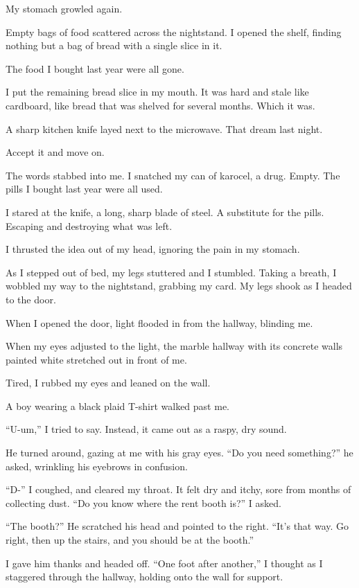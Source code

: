My stomach growled again.

Empty bags of food scattered across the nightstand. I opened the shelf, finding nothing but a bag of bread with a single slice in it. 

The food I bought last year were all gone.

I put the remaining bread slice in my mouth. It was hard and stale like cardboard, like bread that was shelved for several months. Which it was.

A sharp kitchen knife layed next to the microwave. That dream last night.

Accept it and move on.

The words stabbed into me. I snatched my can of karocel, a drug. Empty. The pills I bought last year were all used.

I stared at the knife, a long, sharp blade of steel. A substitute for the pills. Escaping and destroying what was left.

I thrusted the idea out of my head, ignoring the pain in my stomach.

As I stepped out of bed, my legs stuttered and I stumbled. Taking a breath, I wobbled my way to the nightstand, grabbing my card. My legs shook as I headed to the door. 

When I opened the door, light flooded in from the hallway, blinding me. 

When my eyes adjusted to the light, the marble hallway with its concrete walls painted white stretched out in front of me.

Tired, I rubbed my eyes and leaned on the wall.

A boy wearing a black plaid T-shirt walked past me.

“U-um,” I tried to say. Instead, it came out as a raspy, dry sound.

He turned around, gazing at me with his gray eyes. “Do you need something?” he asked, wrinkling his eyebrows in confusion. 

“D-” I coughed, and cleared my throat. It felt dry and itchy, sore from months of collecting dust. “Do you know where the rent booth is?” I asked. 

“The booth?” He scratched his head and pointed to the right. “It’s that way. Go right, then up the stairs, and you should be at the booth.”

I gave him thanks and headed off. “One foot after another,” I thought as I staggered through the hallway, holding onto the wall for support.

